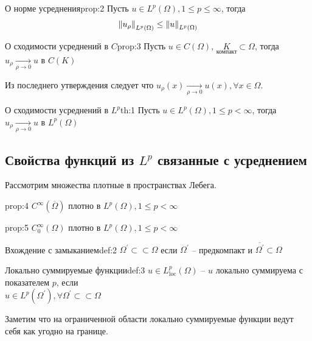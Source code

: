 \documentclass[12pt,a4paper]{article}
\newcommand{\ssubset}{\subset \subset}
\begin{document}
\begin{proposition}{О норме усреднения}{prop:2}
	Пусть $u \in L^{p}(\Omega), 1 \leq p \leq \infty$, тогда 
	$$\norm{u_\rho}_{L^{p}(\Omega)} \leq \norm{u}_{L^{p}(\Omega)}$$
\end{proposition}

\begin{proposition}{О сходимости усреднений в $C$}{prop:3}
	Пусть $u \in C(\Omega)$, $\underset{\text{компакт}}{K} \subset \Omega$, тогда $u_\rho \underset{\rho \to 0}{\to} u$ в $C(K)$
\end{proposition}
Из последнего утверждения следует что $u_\rho (x) \underset{\rho \to 0}{\to} u (x), \forall x \in \Omega$.

\begin{theorem}{О сходимости усреднений в $L^{p}$}{th:1}
	Пусть $u \in L^{p}(\Omega), 1 \leq p < \infty$, тогда $u_\rho \underset{\rho \to 0}{\to} u$ в $L^{p} (\Omega)$
\end{theorem}

\subsection{Свойства функций из $L^p$ связанные с усреднением}

Рассмотрим множества плотные в пространствах Лебега.
\begin{proposition}{}{prop:4}
	$C^{\infty} (\overline{\Omega})$ плотно в $L^p (\Omega), 1 \leq p < \infty$
\end{proposition}

\begin{proposition}{}{prop:5}
	$C^{\infty}_0 (\Omega)$ плотно в $L^p (\Omega), 1 \leq p < \infty$
\end{proposition}

\begin{definition}{Вхождение с замыканием}{def:2}
	$\Omega^{'} \ssubset \Omega$ если $\Omega^{'}$ -- предкомпакт и $\overline{\Omega^{'}} \subset \Omega$
\end{definition}

\begin{definition}{Локально суммируемые функции}{def:3}
	$u \in L^{p}_{\text{loc}} (\Omega)$ -- $u$ локально суммируема с показателем $p$, если \\ $u \in L^{p} (\Omega^{'}), \forall \Omega^{'} \ssubset \Omega$
\end{definition}
Заметим что на ограниченной области локально суммируемые функции ведут себя как угодно на границе.
\end{document}
